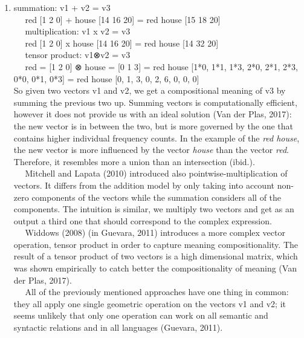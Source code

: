 \documentclass[11pt]{article}
\providecommand{\tightlist}{%
      \setlength{\itemsep}{0pt}\setlength{\parskip}{0pt}}
\begin{document}
\begin{enumerate}
\def\labelenumi{(\arabic{enumi})}
\setcounter{enumi}{2}
\tightlist
\item
  summation: v1 + v2 = v3\\
     red {[}1 2 0{]} + house {[}14 16 20{]} = red house {[}15 18 20{]}\\
      multiplication: v1 x v2 = v3\\
     red {[}1 2 0{]} x house {[}14 16 20{]} = red house {[}14 32 20{]}\\
      tensor product: v1⊗v2 = v3\\
     red = {[}1 2 0{]} ⊗ house = {[}0 1 3{]} = red house {[}1*0, 1*1,
  1*3, 2*0, 2*1, 2*3, 0*0, 0*1, 0*3{]} = red house {[}0, 1, 3, 0, 2, 6,
  0, 0, 0{]}\\
   So given two vectors v1 and v2, we get a compositional meaning of v3
  by summing the previous two up. Summing vectors is computationally
  efficient, however it does not provide us with an ideal solution (Van
  der Plas, 2017): the new vector is in between the two, but is more
  governed by the one that contains higher individual frequency counts.
  In the example of the \emph{red house}, the new vector is more
  influenced by the vector \emph{house} than the vector \emph{red}.
  Therefore, it resembles more a union than an intersection (ibid.).\\
     Mitchell and Lapata (2010) introduced also pointwise-multiplication
  of vectors. It differs from the addition model by only taking into
  account non-zero components of the vectors while the summation
  considers all of the components. The intuition is similar, we multiply
  two vectors and get as an output a third one that should correspond to
  the complex expression.\\
     Widdows (2008) (in Guevara, 2011) introduces a more complex vector
  operation, tensor product in order to capture meaning
  compositionality. The result of a tensor product of two vectors is a
  high dimensional matrix, which was shown empirically to catch better
  the compositionality of meaning (Van der Plas, 2017).\\
     All of the previously mentioned approaches have one thing in
  common: they all apply one single geometric operation on the vectors
  v1 and v2; it seems unlikely that only one operation can work on all
  semantic and syntactic relations and in all languages (Guevara, 2011).
\end{enumerate}
\end{document}
